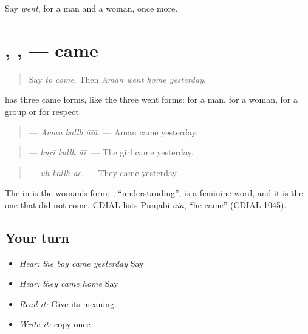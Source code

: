 \begin{tcolorbox}[breakable,colback=teal!4,colframe=teal!35!black,title={Before you move on}]
Say \emph{went}, for a man and a woman, once more.
\end{tcolorbox}
\section[\texorpdfstring{\pa{ਆਇਆ} · \pa{ਆਈ} · \pa{ਆਏ} (āiā · āī · āe)}{ਆਇਆ · ਆਈ · ਆਏ (āiā · āī · āe)}]{, ,  — came}

\label{lesson:PA-C217-aaia}



\begin{quote}
Say \emph{to come}. Then \emph{Aman went home yesterday}.
\end{quote}

\begin{grammarlens}[title={Grammar Lens: came, three ways}]
\textbf{} has three came forms, like the three went forms: \textbf{} for a man, \textbf{} for a woman, \textbf{} for a group or for respect.

\begin{quote}
\textbf{  } — \emph{Aman kallh āiā.} — Aman came yesterday.
\end{quote}

\begin{quote}
\textbf{  } — \emph{kuṛī kallh āī.} — The girl came yesterday.
\end{quote}

\begin{quote}
\textbf{  } — \emph{uh kallh āe.} — They came yesterday.
\end{quote}

The \textbf{} in \textbf{   } is the woman's form: \textbf{}, \textquotedblleft{}understanding\textquotedblright{}, is a feminine word, and it is the one that did not come. CDIAL lists Punjabi \emph{āiā}, \textquotedblleft{}he came\textquotedblright{} (CDIAL 1045).
\end{grammarlens}

\subsection*{Your turn}
\begin{itemize}
\raggedright
  \item \emph{Hear:} \emph{the boy came yesterday} Say \textbf{  }
  \item \emph{Hear:} \emph{they came home} Say \textbf{  }
  \item \emph{Read it:} \textbf{  } Give its meaning.
  \item \emph{Write it:} copy \textbf{} once
\end{itemize}

